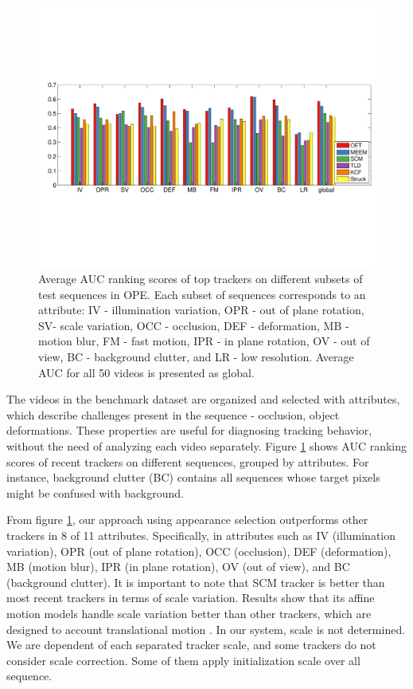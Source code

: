 \begin{figure}[h!]
\centering
\includegraphics[width=1.0\linewidth, trim= 0.2cm 6.15cm 0.2cm 5.8cm, clip=true]{Figures/bar_graph.pdf}
\caption{\small Average AUC ranking scores of top trackers on different subsets of test
		sequences in OPE. Each subset of sequences corresponds to an attribute:
		IV - illumination variation, OPR - out of plane rotation, SV- scale
		variation, OCC - occlusion, DEF - deformation, MB - motion blur, FM -
		fast motion, IPR - in plane rotation, OV - out of view, BC - background
		clutter, and LR - low resolution. Average AUC for all 50 videos is
		presented as global.}
\label{fig:attributes}
\end{figure}

The videos in the benchmark dataset are organized and selected with attributes,
which describe challenges present in the sequence - \eg occlusion, object
deformations. These properties are useful for diagnosing tracking behavior,
without the need of analyzing each video separately. Figure \ref{fig:attributes}
shows AUC ranking scores of recent trackers on different sequences, grouped by
attributes. For instance, background clutter (BC) contains all sequences whose
target pixels might be confused with background.

From figure \ref{fig:attributes}, our approach using appearance selection
outperforms other trackers in 8 of 11 attributes. Specifically, in attributes
such as IV (illumination variation), OPR (out of plane rotation), OCC
(occlusion), DEF (deformation), MB (motion blur), IPR (in plane rotation),
OV (out of view), and BC (background clutter). It is important to note that SCM
tracker is better than most recent trackers in terms of scale variation.
Results show that its affine motion models handle scale
variation better than other trackers, which are designed to account
translational motion \cite{Wu2013}. In our system, scale is not determined. We
are dependent of each separated tracker scale, and some trackers do not consider
scale correction. Some of them apply initialization scale over all sequence.



